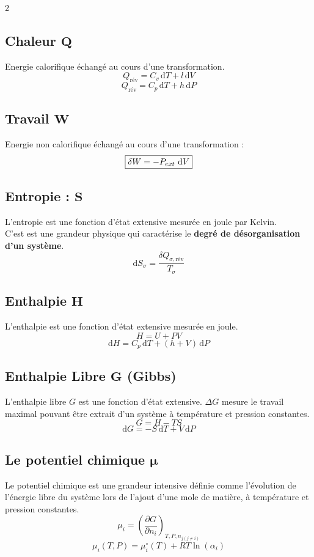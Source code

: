 \documentclass[a4paper,12pt]{article}
\newcommand{\diff}{\mathrm{d}} %
\newcommand{\re}{\textrm}
\begin{document}
\begin{multicols}{2}
    \subsection*{Chaleur $\bm{Q}$}
        Energie calorifique échangé au cours d'une transformation.
            $$ \boxed{ Q_{\text{rév}} = C_v \, \diff T + l \, \diff V } $$
            $$ \boxed{ Q_{\text{rév}} = C_p \, \diff T + h \, \diff P } $$

    \subsection*{Travail $\bm{W}$}
        Energie non calorifique échangé au cours d'une transformation :
            $$ \boxed{\delta W = - P_{ext}\ \re d V} $$

    \subsection*{Entropie : $\bm{S}$}
        L'entropie est une fonction d'état extensive mesurée en joule par Kelvin.\\
        C'est est une grandeur physique qui caractérise le \textbf{degré de désorganisation d'un système}.
        $$ \boxed{\diff S_\sigma = \frac{\delta Q_{\sigma,\text{rév}}}{T_\sigma}} $$
    
    \subsection*{Enthalpie $\bm{H}$}
        L'enthalpie est une fonction d'état extensive mesurée en joule.
            $$ \boxed{H = U + P V} $$
            $$ \boxed{ \diff H = C_p \, \diff T + (h + V) \, \diff P } $$

    \subsection*{Enthalpie Libre $\bm{G}$ (Gibbs)}
        L'enthalpie libre $G$ est une fonction d'état extensive. $\Delta G$ mesure le travail maximal pouvant être
        extrait d'un système à température et pression constantes.
            $$ \boxed{ G = H - TS } $$
            $$ \boxed{ \diff G = - S \, \diff T + V \, \diff P } $$

    \subsection*{Le potentiel chimique $\bm{\mu}$}
        Le potentiel chimique est une grandeur intensive définie comme l'évolution de l'énergie
        libre du système lors de l'ajout d'une mole de matière, à température et pression constantes.
            $$ \boxed{ \mu_i = \left(\frac{\partial G}{\partial n_i}\right)_{T,P,n_{j(j \ne i)}} } $$
            $$ \boxed{ \mu_i(T,P) = \mu_i^{\circ}(T) + RT\ln{(\alpha_i)} }$$

    \end{multicols}
\end{document}
